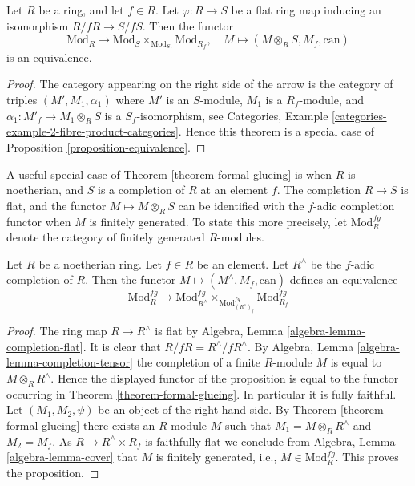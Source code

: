 \begin{theorem}
\label{theorem-formal-glueing}
Let $R$ be a ring, and let $f \in R$.
Let $\varphi : R \to S$ be a flat ring map inducing an isomorphism
$R/fR \to S/fS$. Then the functor
$$
\text{Mod}_R
\longrightarrow
\text{Mod}_S \times_{\text{Mod}_{S_f}} \text{Mod}_{R_f},
\quad
M
\longmapsto
(M \otimes_R S, M_f, \text{can})
$$
is an equivalence.
\end{theorem}

\begin{proof}
The category appearing on the right side of the arrow
is the category of triples $(M', M_1, \alpha_1)$ where $M'$ is an
$S$-module, $M_1$ is a $R_f$-module, and
$\alpha_1 : M'_f \to M_1 \otimes_R S$ is a $S_f$-isomorphism, see
Categories, Example \ref{categories-example-2-fibre-product-categories}.
Hence this theorem is a special case of
Proposition \ref{proposition-equivalence}.
\end{proof}

\noindent
A useful special case of
Theorem \ref{theorem-formal-glueing}
is when $R$ is noetherian, and $S$ is a completion of $R$ at an
element $f$. The completion $R \to S$ is flat, and the functor
$M \mapsto M \otimes_R S$ can be identified with the $f$-adic
completion functor when $M$ is finitely generated. To state
this more precisely, let $\text{Mod}^{fg}_R$ denote the category
of finitely generated $R$-modules.

\begin{proposition}
\label{proposition-formal-glueing}
Let $R$ be a noetherian ring.
Let $f \in R$ be an element.
Let $R^\wedge$ be the $f$-adic completion of $R$.
Then the functor $M \mapsto (M^\wedge, M_f, \text{can})$
defines an equivalence
$$
\text{Mod}^{fg}_R
\longrightarrow
\text{Mod}^{fg}_{R^\wedge}
\times_{\text{Mod}^{fg}_{(R^\wedge)_f}}
\text{Mod}^{fg}_{R_f}
$$
\end{proposition}

\begin{proof}
The ring map $R \to R^\wedge$ is flat by
Algebra, Lemma \ref{algebra-lemma-completion-flat}.
It is clear that $R/fR = R^\wedge/fR^\wedge$.
By
Algebra, Lemma \ref{algebra-lemma-completion-tensor}
the completion of a finite $R$-module $M$ is equal to $M \otimes_R R^\wedge$.
Hence the displayed functor of the proposition is equal to the
functor occurring in
Theorem \ref{theorem-formal-glueing}.
In particular it is fully faithful. Let $(M_1, M_2, \psi)$ be an
object of the right hand side. By
Theorem \ref{theorem-formal-glueing}
there exists an $R$-module $M$ such that
$M_1 = M \otimes_R R^\wedge$ and $M_2 = M_f$. As $R \to R^\wedge \times R_f$
is faithfully flat we conclude from
Algebra, Lemma \ref{algebra-lemma-cover}
that $M$ is finitely generated, i.e., $M \in \text{Mod}^{fg}_R$.
This proves the proposition.
\end{proof}

